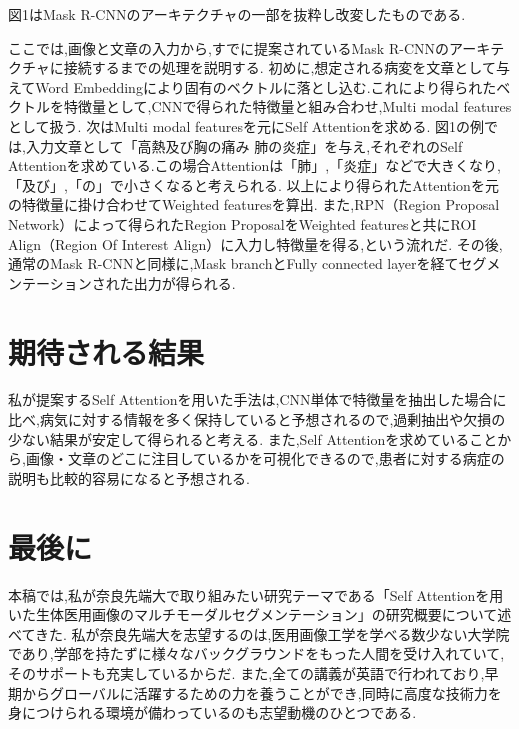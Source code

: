 \documentclass[a4j,10pt, twocolumn]{jarticle}
\begin{document}
図1はMask R-CNNのアーキテクチャの一部を抜粋し改変したものである.

ここでは,画像と文章の入力から,すでに提案されているMask R-CNNのアーキテクチャに接続するまでの処理を説明する.
初めに,想定される病変を文章として与えてWord Embedding\cite{堅山耀太郎2017word}により固有のベクトルに落とし込む.これにより得られたベクトルを特徴量として,CNNで得られた特徴量と組み合わせ,Multi modal featuresとして扱う.
次はMulti modal featuresを元にSelf Attentionを求める.
図1の例では,入力文章として「高熱及び胸の痛み 肺の炎症」を与え,それぞれのSelf Attentionを求めている.この場合Attentionは「肺」,「炎症」などで大きくなり,「及び」,「の」で小さくなると考えられる.
以上により得られたAttentionを元の特徴量に掛け合わせてWeighted featuresを算出.
また,RPN（Region Proposal Network）\cite{ren2015faster}によって得られたRegion ProposalをWeighted featuresと共にROI Align（Region Of Interest Align）に入力し特徴量を得る,という流れだ.
その後,通常のMask R-CNNと同様に,Mask branchとFully connected layerを経てセグメンテーションされた出力が得られる.
\section{期待される結果}
私が提案するSelf Attentionを用いた手法は,CNN単体で特徴量を抽出した場合に比べ,病気に対する情報を多く保持していると予想されるので,過剰抽出や欠損の少ない結果が安定して得られると考える.
また,Self Attentionを求めていることから,画像・文章のどこに注目しているかを可視化できるので,患者に対する病症の説明も比較的容易になると予想される.

\section{最後に}
本稿では,私が奈良先端大で取り組みたい研究テーマである「Self Attentionを用いた生体医用画像のマルチモーダルセグメンテーション」の研究概要について述べてきた.
私が奈良先端大を志望するのは,医用画像工学を学べる数少ない大学院であり,学部を持たずに様々なバックグラウンドをもった人間を受け入れていて,そのサポートも充実しているからだ.
また,全ての講義が英語で行われており,早期からグローバルに活躍するための力を養うことができ,同時に高度な技術力を身につけられる環境が備わっているのも志望動機のひとつである.



\end{document}
